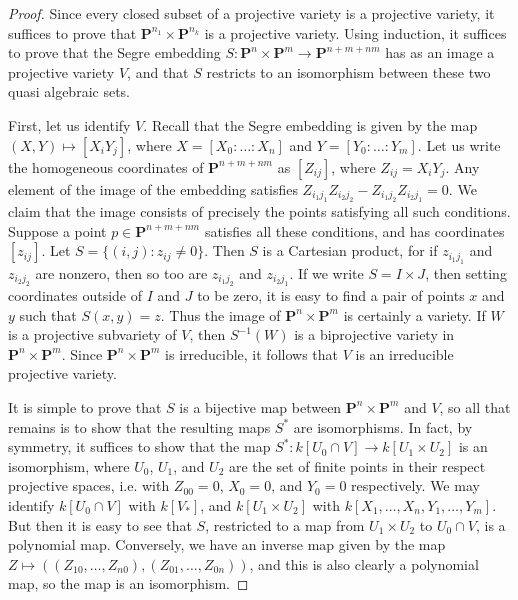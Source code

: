 \begin{proof}
    Since every closed subset of a projective variety is a projective variety, it suffices to prove that $\mathbf{P}^{n_1} \times \mathbf{P}^{n_k}$ is a projective variety. Using induction, it suffices to prove that the Segre embedding $S: \mathbf{P}^n \times \mathbf{P}^m \to \mathbf{P}^{n+m+nm}$ has as an image a projective variety $V$, and that $S$ restricts to an isomorphism between these two quasi algebraic sets.

    First, let us identify $V$. Recall that the Segre embedding is given by the map $(X,Y) \mapsto [X_iY_j]$, where $X = [X_0:\dots:X_n]$ and $Y=[Y_0:\dots:Y_m]$. Let us write the homogeneous coordinates of $\mathbf{P}^{n+m+nm}$ as $[Z_{ij}]$, where $Z_{ij} = X_iY_j$. Any element of the image of the embedding satisfies $Z_{i_1j_1} Z_{i_2j_2} - Z_{i_1j_2} Z_{i_2j_1} = 0$. We claim that the image consists of precisely the points satisfying all such conditions. Suppose a point $p \in \mathbf{P}^{n+m+nm}$ satisfies all these conditions, and has coordinates $[z_{ij}]$. Let $S = \{ (i,j) : z_{ij} \neq 0 \}$. Then $S$ is a Cartesian product, for if $z_{i_1j_1}$ and $z_{i_2j_2}$ are nonzero, then so too are $z_{i_1j_2}$ and $z_{i_2j_1}$. If we write $S = I \times J$, then setting coordinates outside of $I$ and $J$ to be zero, it is easy to find a pair of points $x$ and $y$ such that $S(x,y) = z$. Thus the image of $\mathbf{P}^n \times \mathbf{P}^m$ is certainly a variety. If $W$ is a projective subvariety of $V$, then $S^{-1}(W)$ is a biprojective variety in $\mathbf{P}^n \times \mathbf{P}^m$. Since $\mathbf{P}^n \times \mathbf{P}^m$ is irreducible, it follows that $V$ is an irreducible projective variety.

    It is simple to prove that $S$ is a bijective map between $\mathbf{P}^n \times \mathbf{P}^m$ and $V$, so all that remains is to show that the resulting maps $S^*$ are isomorphisms. In fact, by symmetry, it suffices to show that the map $S^*: k[U_0 \cap V] \to k[U_1 \times U_2]$ is an isomorphism, where $U_0$, $U_1$, and $U_2$ are the set of finite points in their respect projective spaces, i.e. with $Z_{00} = 0$, $X_0 = 0$, and $Y_0 = 0$ respectively. We may identify $k[U_0 \cap V]$ with $k[V_*]$, and $k[U_1 \times U_2]$ with $k[X_1,\dots,X_n,Y_1,\dots,Y_m]$. But then it is easy to see that $S$, restricted to a map from $U_1 \times U_2$ to $U_0 \cap V$, is a polynomial map. Conversely, we have an inverse map given by the map $Z \mapsto ((Z_{10},\dots,Z_{n0}),(Z_{01},\dots,Z_{0n}))$, and this is also clearly a polynomial map, so the map is an isomorphism.
\end{proof}

